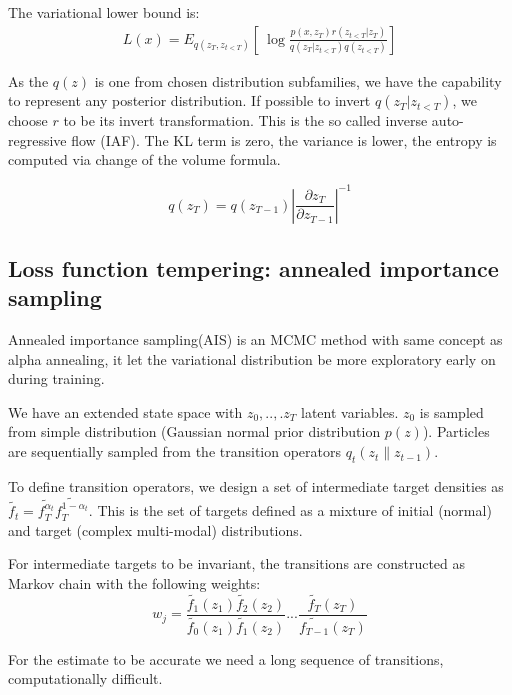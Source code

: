 \documentclass{article}
\begin{document}
The variational lower bound is:
\begin{align*}
    L(x) = E_{q(z_T, z_{t<T})}[\ 
    \log \frac{p(x, z_T) r(z_{t<T} | z_T)}{q(z_T | z_{t<T}) q(z_{t<T})} ]
\end{align*}

As the $q(z)$ is one from chosen distribution subfamilies, we have the capability to represent any posterior distribution.
If possible to invert $q(z_T | z_{t<T})$, we choose $r$ to be its invert transformation. This is the so called inverse auto-regressive flow (IAF). The KL term is zero, the variance is lower, the entropy is computed via change of the volume formula.

\begin{equation}
    q(z_T) = q(z_{T-1}) |\frac{\partial z_T}{\partial z_{T-1}}|^{-1}
\end{equation}

\subsection*{Loss function tempering: annealed importance sampling}

Annealed importance sampling(AIS) is an MCMC method with same concept as alpha annealing, it let the variational distribution be more exploratory early on during training.

We have an extended state space with $z_0, ..,. z_T$ latent variables.
$z_0$ is sampled from simple distribution (Gaussian normal prior distribution $p(z)$).
Particles are sequentially sampled from the transition operators $q_t(z_t\|z_{t-1})$.

To define transition operators, we design a set of intermediate target densities as 
$\tilde{f_t} = \tilde{f_T^{\alpha_t}}\tilde{f_T^{1 - \alpha_t}}$.
This is the set of targets defined as a mixture of initial (normal) and target (complex multi-modal) distributions.

For intermediate targets to be invariant, the transitions are constructed as Markov chain with the following weights:
\begin{equation*}
    w_j = \frac{\tilde{f_1}(z_1)\tilde{f_2}(z_2)}{\tilde{f_0}(z_1)\tilde{f_1}(z_2)} ... \frac{\tilde{f_T}(z_T)}{\tilde{f_{T-1}}(z_{T})}
\end{equation*}

For the estimate to be accurate we need a long sequence of transitions, computationally difficult.
\end{document}
